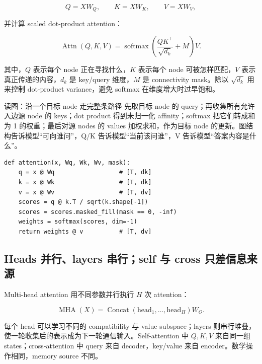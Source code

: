 \[
Q=XW_Q,\qquad K=XW_K,\qquad V=XW_V,
\]

并计算 scaled dot-product attention：

\[
\operatorname{Attn}(Q,K,V)=
\operatorname{softmax}\!\left(\frac{QK^\top}{\sqrt{d_k}}+M\right)V.
\]

其中，$Q$ 表示每个 node 正在寻找什么，$K$ 表示每个 node 可被怎样匹配，$V$ 表示真正传递的内容，$d_k$ 是 key/query 维度，$M$ 是 connectivity mask。除以 $\sqrt{d_k}$ 用来控制 dot-product variance，避免 softmax 在维度增大时过早饱和。


\begin{knowledgebox}{读图：沿一个目标 node 走完整条路径}
先取目标 node 的 query；再收集所有允许入边源 node 的 keys；dot product 得到未归一化 affinity；softmax 把它们转成和为 1 的权重；最后对源 nodes 的 values 加权求和，作为目标 node 的更新。图结构告诉模型“可向谁问”，Q/K 告诉模型“当前该问谁”，V 告诉模型“答案内容是什么”。
\end{knowledgebox}

\begin{lstlisting}[caption={单头 attention 的最小矩阵表达；真实实现还需要 batch/head 维度与 dropout。}]
def attention(x, Wq, Wk, Wv, mask):
    q = x @ Wq                  # [T, dk]
    k = x @ Wk                  # [T, dk]
    v = x @ Wv                  # [T, dv]
    scores = q @ k.T / sqrt(k.shape[-1])
    scores = scores.masked_fill(mask == 0, -inf)
    weights = softmax(scores, dim=-1)
    return weights @ v          # [T, dv]
\end{lstlisting}

\subsection{Heads 并行、layers 串行；self 与 cross 只差信息来源}

Multi-head attention 用不同参数并行执行 $H$ 次 attention：

\[
\operatorname{MHA}(X)=\operatorname{Concat}(\text{head}_1,\ldots,\text{head}_H)W_O.
\]

每个 head 可以学习不同的 compatibility 与 value subspace；layers 则串行堆叠，使一轮收集后的表示成为下一轮通信输入。Self-attention 中 $Q,K,V$ 来自同一组 states；cross-attention 中 query 来自 decoder，key/value 来自 encoder。数学操作相同，memory source 不同。


